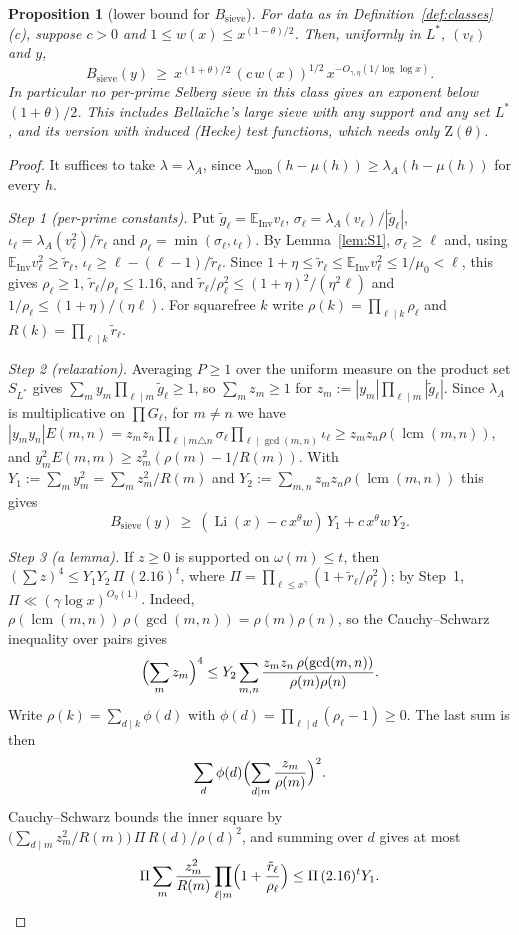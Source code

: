 \documentclass[11pt]{amsart}
\newtheorem{proposition}[theorem]{Proposition}
\theoremstyle{definition}
\theoremstyle{remark}
\DeclareMathOperator{\Li}{Li}
\newcommand{\Inv}{\mathrm{Inv}}
\newcommand{\Zt}{\mathrm{Z}}       %
\begin{document}
\begin{proposition}[lower bound for $B_{\mathrm{sieve}}$]\label{prop:sieve}
For data as in Definition~\ref{def:classes}(c), suppose $c>0$ and $1\le w(x)\le x^{(1-\theta)/2}$. Then, uniformly in
$L^*$, $(v_\ell)$ and $y$,
\[
  B_{\mathrm{sieve}}(y)\ \ge\ x^{(1+\theta)/2}\,(c\,w(x))^{1/2}\,x^{-O_{\gamma,\eta}(1/\log\log x)}.
\]
In particular no per-prime Selberg sieve in this class gives an exponent below $(1+\theta)/2$. This includes
Bella\"iche's large sieve with any support and any set $L^*$, and its version with induced (Hecke) test functions,
which needs only $\Zt(\theta)$.
\end{proposition}

\begin{proof}
It suffices to take $\lambda=\lambda_A$, since $\lambda_{\mathrm{mon}}(h-\mu(h))\ge\lambda_A(h-\mu(h))$ for every $h$.

\emph{Step 1 (per-prime constants).} Put $\tilde g_\ell=\mathbb E_{\Inv}v_\ell$,
$\sigma_\ell=\lambda_A(v_\ell)/|\tilde g_\ell|$, $\iota_\ell=\lambda_A(v_\ell^2)/\tilde r_\ell$ and
$\rho_\ell=\min(\sigma_\ell,\iota_\ell)$. By Lemma~\ref{lem:S1}, $\sigma_\ell\ge\ell$ and, using
$\mathbb E_{\Inv}v_\ell^2\ge\tilde r_\ell$, $\iota_\ell\ge\ell-(\ell-1)/\tilde r_\ell$. Since $1+\eta\le\tilde
r_\ell\le\mathbb E_{\Inv}v_\ell^2\le1/\mu_0<\ell$, this gives $\rho_\ell\ge1$, $\tilde r_\ell/\rho_\ell\le1.16$, and
$\tilde r_\ell/\rho_\ell^2\le(1+\eta)^2/(\eta^2\ell)$ and $1/\rho_\ell\le(1+\eta)/(\eta\ell)$. For squarefree $k$ write
$\rho(k)=\prod_{\ell\mid k}\rho_\ell$ and $R(k)=\prod_{\ell\mid k}\tilde r_\ell$.

\emph{Step 2 (relaxation).} Averaging $P\ge1$ over the uniform measure on the product set $S_{L^*}$ gives
$\sum_my_m\prod_{\ell\mid m}\tilde g_\ell\ge1$, so $\sum_mz_m\ge1$ for $z_m:=|y_m|\prod_{\ell\mid m}|\tilde g_\ell|$.
Since $\lambda_A$ is multiplicative on $\prod G_\ell$, for $m\ne n$ we have
$|y_my_n|E(m,n)=z_mz_n\prod_{\ell\mid m\triangle n}\sigma_\ell\prod_{\ell\mid\gcd(m,n)}\iota_\ell\ge z_mz_n\rho(\operatorname{lcm}(m,n))$,
and $y_m^2E(m,m)\ge z_m^2(\rho(m)-1/R(m))$. With $Y_1:=\sum_my_m^2=\sum_mz_m^2/R(m)$ and
$Y_2:=\sum_{m,n}z_mz_n\rho(\operatorname{lcm}(m,n))$ this gives
\[
  B_{\mathrm{sieve}}(y)\ \ge\ (\Li(x)-c\,x^\theta w)\,Y_1+c\,x^\theta w\,Y_2.
\]

\emph{Step 3 (a lemma).} If $z\ge0$ is supported on $\omega(m)\le t$, then $(\sum z)^4\le Y_1Y_2\,\Pi\,(2.16)^t$, where
$\Pi=\prod_{\ell\le x^\gamma}(1+\tilde r_\ell/\rho_\ell^2)$; by Step~1, $\Pi\ll(\gamma\log x)^{O_\eta(1)}$. Indeed,
$\rho(\operatorname{lcm}(m,n))\,\rho(\gcd(m,n))=\rho(m)\rho(n)$, so the Cauchy--Schwarz inequality over pairs gives
\[
  \Bigl(\sum_mz_m\Bigr)^4\le Y_2\sum_{m,n}\frac{z_mz_n\,\rho(\gcd(m,n))}{\rho(m)\rho(n)}.
\]
Write $\rho(k)=\sum_{d\mid k}\phi(d)$ with $\phi(d)=\prod_{\ell\mid d}(\rho_\ell-1)\ge0$. The last sum is then
\[
  \sum_d\phi(d)\Bigl(\sum_{d\mid m}\frac{z_m}{\rho(m)}\Bigr)^2.
\]
Cauchy--Schwarz bounds the inner square by $\bigl(\sum_{d\mid m}z_m^2/R(m)\bigr)\,\Pi\,R(d)/\rho(d)^2$, and summing
over $d$ gives at most
\[
  \Pi\sum_m\frac{z_m^2}{R(m)}\prod_{\ell\mid m}\Bigl(1+\frac{\tilde r_\ell}{\rho_\ell}\Bigr)\le\Pi\,(2.16)^tY_1.
\]


\end{proof}
\end{document}

